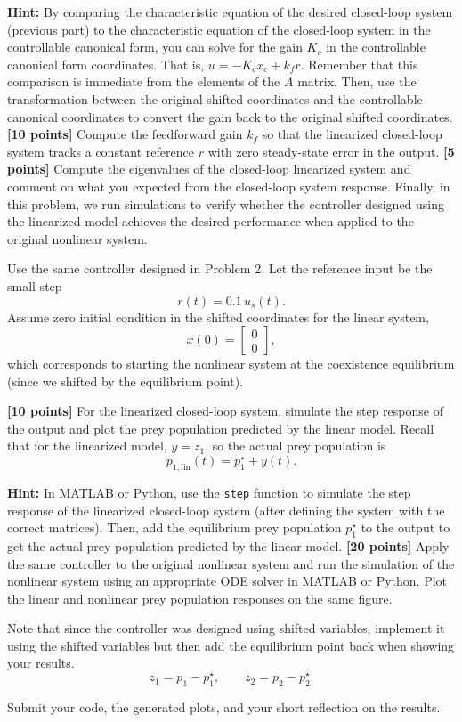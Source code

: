 \documentclass{ee122_pset}
\begin{document}
\textbf{Hint:} By comparing the characteristic equation of the desired closed-loop system (previous part) to the characteristic equation of the closed-loop system in the controllable canonical form, you can solve for the gain \(K_c\) in the controllable canonical form coordinates. That is, $u = -K_c x_c + k_f r$. Remember that this comparison is immediate from the elements of the $A$ matrix. Then, use the transformation between the original shifted coordinates and the controllable canonical coordinates to convert the gain back to the original shifted coordinates. 
\problempart \textbf{[10 points]} Compute the feedforward gain \(k_f\) so that the linearized closed-loop system tracks a constant reference \(r\) with zero steady-state error in the output.
\problempart \textbf{[5 points]} Compute the eigenvalues of the closed-loop linearized system and comment on what you expected from the closed-loop system response.
 Finally, in this problem, we run simulations to verify whether the controller designed using the linearized model achieves the desired performance when applied to the original nonlinear system.

Use the same controller designed in Problem 2. Let the reference input be the small step
\[
r(t)=0.1\,u_s(t).
\]
Assume zero initial condition in the shifted coordinates for the linear system,
\[
x(0)=\begin{bmatrix}0\\0\end{bmatrix},
\]
which corresponds to starting the nonlinear system at the coexistence equilibrium (since we shifted by the equilibrium point).

\problempart \textbf{[10 points]} For the linearized closed-loop system, simulate the step response of the output and plot the prey population predicted by the linear model. Recall that for the linearized model, \(y=z_1\), so the actual prey population is
\[
p_{1,\mathrm{lin}}(t)=p_1^\star + y(t).
\]

\textbf{Hint:} In MATLAB or Python, use the \texttt{step} function to simulate the step response of the linearized closed-loop system (after defining the system with the correct matrices). Then, add the equilibrium prey population \(p_1^\star\) to the output to get the actual prey population predicted by the linear model. 
\problempart \textbf{[20 points]} Apply the same controller to the original nonlinear system and run the simulation of the nonlinear system using an appropriate ODE solver in MATLAB or Python. Plot the linear and nonlinear prey population responses on the same figure. 

Note that since the controller was designed using shifted variables, implement it using the shifted variables but then add the equilibrium point back when showing your results.
\[
z_1=p_1-p_1^\star,
\qquad
z_2=p_2-p_2^\star.
\]

Submit your code, the generated plots, and your short reflection on the results.
\end{document}
